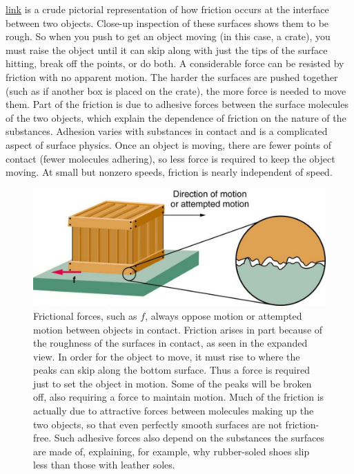 \documentclass[
]{book}
\begin{document}
\protect\hyperlink{import-auto-id1165298476574}{link}
\textbf{}is a crude pictorial representation of
how friction occurs at the interface between two objects. Close-up
inspection of these surfaces shows them to be rough. So when you push to
get an object moving (in this case, a crate), you must raise the object
until it can skip along with just the tips of the surface hitting, break
off the points, or do both. A considerable force can be resisted by
friction with no apparent motion. The harder the surfaces are pushed
together (such as if another box is placed on the crate), the more force
is needed to move them. Part of the friction is due to adhesive forces
between the surface molecules of the two objects, which explain the
dependence of friction on the nature of the substances. Adhesion varies
with substances in contact and is a complicated aspect of surface
physics. Once an object is moving, there are fewer points of contact
(fewer molecules adhering), so less force is required to keep the object
moving. At small but nonzero speeds, friction is nearly independent of
speed.

\begin{figure}
\hypertarget{import-auto-id1165298476574}{%
\centering
\includegraphics{images/Figure_06_01_01a.jpg}
\caption{Frictional forces, such as \(f{}\), always oppose motion or attempted
motion between objects in contact. Friction arises in part because of
the roughness of the surfaces in contact, as seen in the expanded view.
In order for the object to move, it must rise to where the peaks can
skip along the bottom surface. Thus a force is required just to set the
object in motion. Some of the peaks will be broken off, also requiring a
force to maintain motion. Much of the friction is actually due to
attractive forces between molecules making up the two objects, so that
even perfectly smooth surfaces are not friction-free. Such adhesive
forces also depend on the substances the surfaces are made of,
explaining, for example, why rubber-soled shoes slip less than those
with leather
soles.}\label{import-auto-id1165298476574}
}
\end{figure}
\end{document}
